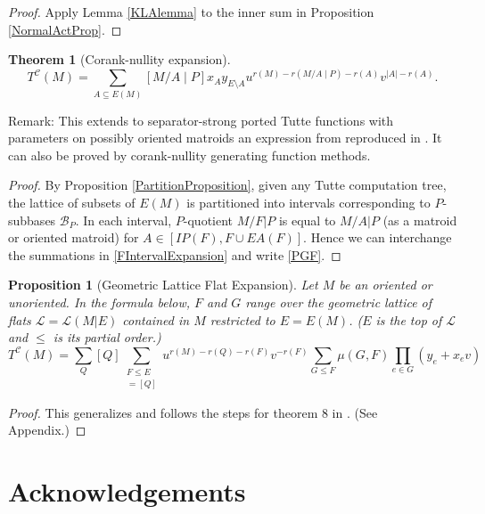 \documentclass[12pt,leqno]{amsart}
\newtheorem{prop}[lem]{Proposition}
\newtheorem{thm}[lem]{Theorem}
\theoremstyle{remark}
\begin{document}
\begin{proof}
Apply Lemma \ref{KLAlemma} to the inner sum in
Proposition \ref{NormalActProp}.
\end{proof}

\begin{thm}[Corank-nullity expansion]
\begin{equation}
\tag{PGF}
\label{PGF}
T^{\mathcal{C}}(M) = \sum_{A\subseteq E(M)}[M/A \mid P]x_A y_{E\setminus A}
u^{r(M)-r(M/A\mid P)-r(A)}
v^{|A|-r(A)}.
\end{equation}
\end{thm}

Remark: This extends to separator-strong ported Tutte functions
with parameters on possibly oriented matroids
an expression from \cite{MR0419272} reproduced in \cite{sdcPorted}.  It can
also be proved by corank-nullity generating function methods.

\begin{proof}
By Proposition \ref{PartitionProposition}, given any Tutte computation tree,
the lattice of subsets of $E(M)$ is partitioned
into intervals corresponding to $P$-subbases $\mathcal{B}_P$.  
In each interval, 
$P$-quotient $M/F|P$ is equal to 
$M/A|P$ (as a matroid or oriented matroid)
for 
$A\in [IP(F),F\cup EA(F)]$.
Hence we can 
interchange the summations in \eqref{FIntervalExpansion} and write
\eqref{PGF}.
\end{proof}


\begin{prop}[Geometric Lattice Flat Expansion]
\label{GFlatProp}
Let $M$ be an oriented or unoriented.
In the formula below,
$F$ and $G$ range over the geometric lattice of flats 
$\mathcal{L}=\mathcal{L}(M|E)$ contained
in $M$ restricted to $E = E(M)$.  
($E$ is the top of $\mathcal{L}$ and $\le$
is its partial order.)
\[
T^{\mathcal{C}}(M) = \sum_{Q} [Q]
      \sum_{\substack{F\leq E\\
                     [M/F|P]=[Q]
           }}
                   u^{r(M)-r(Q)-r(F)}
                   v^{-r(F)}
                   \sum_{G\le F}
                   \mu(G,F)
                   \prod_{e\in G}
                    (y_e+x_ev)
\]
\end{prop}

\begin{proof}
This 
generalizes and 
follows the steps for theorem 8 in \cite{sdcPorted}.  (See Appendix.)
\end{proof}


\section{Acknowledgements}
\end{document}
